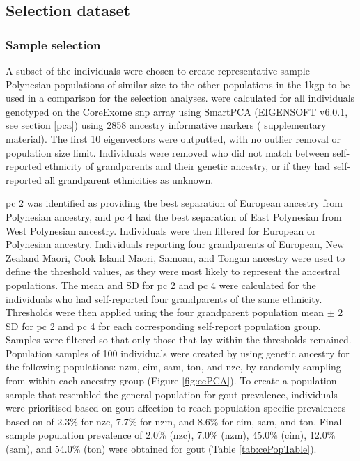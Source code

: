 \documentclass[twoside,openright]{report}
\newcommand{\tex}[1]{#1}
\begin{document}
\subsection{Selection dataset}\label{selectionDataset}

\subsubsection{Sample selection}\label{sample-selection}

A subset of the individuals were chosen to create representative sample
Polynesian populations of similar size to the other populations in the
\gls{1kgp} to be used in a comparison for the selection analyses.
 were calculated for all individuals genotyped on
the CoreExome \gls{snp} array using SmartPCA (EIGENSOFT v6.0.1, see
section \ref{pca}) using 2858 ancestry informative markers
(\citet{Guo2014} supplementary material). The first 10 eigenvectors were
outputted, with no outlier removal or population size limit. Individuals
were removed who did not match between self-reported ethnicity of
grandparents and their genetic ancestry, or if they had self-reported
all grandparent ethnicities as unknown.

\Glsdesc{pc} 2 was identified as providing the best separation of
European ancestry from Polynesian ancestry, and \gls{pc} 4 had the best
separation of East Polynesian from West Polynesian ancestry. Individuals
were then filtered for European or Polynesian ancestry. Individuals
reporting four grandparents of European, New Zealand M\tex{\={a}}ori,
Cook Island M\tex{\={a}}ori, Samoan, and Tongan ancestry were used to
define the threshold values, as they were most likely to represent the
ancestral populations. The mean and SD for \gls{pc} 2 and \gls{pc} 4
were calculated for the individuals who had self-reported four
grandparents of the same ethnicity. Thresholds were then applied using
the four grandparent population mean \(\pm\) 2 SD for \gls{pc} 2 and
\gls{pc} 4 for each corresponding self-report population group. Samples
were filtered so that only those that lay within the thresholds
remained. Population samples of 100 individuals were created by using
genetic ancestry for the following populations: \glsdesc{nzm},
\glsdesc{cim}, \glsdesc{sam}, \glsdesc{ton}, and \glsdesc{nzc}, by
randomly sampling from within each ancestry group (Figure
\ref{fig:cePCA}). To create a population sample that resembled the
general population for gout prevalence, individuals were prioritised
based on gout affection to reach population specific prevalences based
on \citet{Winnard2013} of 2.3\% for \gls{nzc}, 7.7\% for \gls{nzm}, and
8.6\% for \gls{cim}, \gls{sam}, and \gls{ton}. Final sample population
prevalence of 2.0\% (\gls{nzc}), 7.0\% (\gls{nzm}), 45.0\% (\gls{cim}),
12.0\% (\gls{sam}), and 54.0\% (\gls{ton}) were obtained for gout (Table
\ref{tab:cePopTable}).
\end{document}
